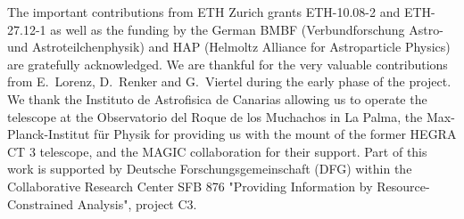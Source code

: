 The important contributions from ETH Zurich grants ETH-10.08-2 and ETH-27.12-1 as well as the funding by the German BMBF (Verbundforschung Astro- und Astroteilchenphysik) and HAP (Helmoltz Alliance for Astroparticle Physics) are gratefully acknowledged.
We are thankful for the very valuable contributions from E.~Lorenz,  D.~Renker and G.~Viertel during the early phase of the project.
We thank the Instituto de Astrofisica de Canarias allowing us to operate the telescope at the Observatorio del Roque de los Muchachos in La Palma, the Max-Planck-Institut f\"ur Physik for providing us with the mount of the former HEGRA CT 3 telescope, and the MAGIC collaboration for their support.
Part of this work is supported by Deutsche Forschungsgemeinschaft (DFG) within the Collaborative Research Center SFB 876 "Providing Information by Resource-Constrained Analysis", project C3. 
